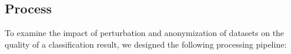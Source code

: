 \documentclass{llncs}
\begin{document}
\subsection{Process}
\label{ssect:process}

To examine the impact of perturbation and anonymization of datasets on the quality of a classification result, we designed the following processing pipeline:


\end{document}

